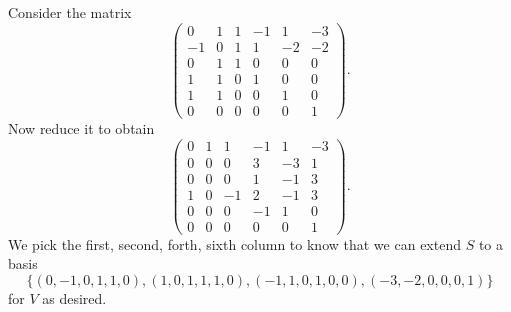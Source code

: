 \begin{Exercise}
\begin{enumerate}[(a)]
\begin{solution}
Consider the matrix
$$
\begin{pmatrix}
0 & 1 & 1 & -1 & 1 & -3 \\
-1 & 0 & 1 & 1 & -2 & -2 \\
0 & 1 & 1 & 0 & 0 & 0 \\
1 & 1 & 0 & 1 & 0 & 0 \\
1 & 1 & 0 & 0 & 1 & 0 \\
0 & 0 & 0 & 0 & 0 & 1
\end{pmatrix}.
$$
Now reduce it to obtain
$$
\begin{pmatrix}
0 & 1 & 1 & -1 & 1 & -3 \\
0 & 0 & 0 & 3 & -3 & 1 \\
0 & 0 & 0 & 1 & -1 & 3 \\
1 & 0 & -1 & 2 & -1 & 3 \\
0 & 0 & 0 & -1 & 1 & 0 \\
0 & 0 & 0 & 0 & 0 & 1
\end{pmatrix}.
$$
We pick the first, second, forth, sixth column to know that
we can extend $S$ to a basis 
$$
\{(0,-1,0,1,1,0),(1,0,1,1,1,0),(-1,1,0,1,0,0),(-3,-2,0,0,0,1)\}
$$
for $V$ as desired.
\end{solution}

\end{enumerate}
\end{Exercise}